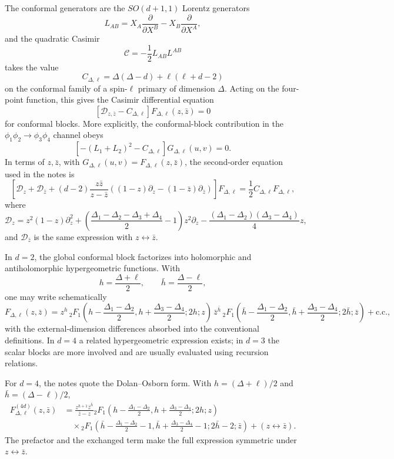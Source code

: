 The conformal generators are the \(SO(d+1,1)\) Lorentz generators
\[
  L_{AB}=X_A\frac{\partial}{\partial X^B}
        -X_B\frac{\partial}{\partial X^A},
\]
and the quadratic Casimir
\[
  \mathcal C=-\frac12 L_{AB}L^{AB}
\]
takes the value
\[
  C_{\Delta,\ell}
  =
  \Delta(\Delta-d)+\ell(\ell+d-2)
\]
on the conformal family of a spin-\(\ell\) primary of dimension
\(\Delta\).  Acting on the four-point function, this gives the Casimir
differential equation
\[
  \left[\mathcal D_{z,\bar z}-C_{\Delta,\ell}\right]
  F_{\Delta,\ell}(z,\bar z)=0
\]
for conformal blocks.
More explicitly, the conformal-block contribution in the
\(\phi_1\phi_2\to\phi_3\phi_4\) channel obeys
\[
  \left[-(L_1+L_2)^2-C_{\Delta,\ell}\right]
  G_{\Delta,\ell}(u,v)=0.
\]
In terms of \(z,\bar z\), with \(G_{\Delta,\ell}(u,v)=F_{\Delta,\ell}(z,\bar z)\),
the second-order equation used in the notes is
\[
  \left[
    \mathcal D_z+\mathcal D_{\bar z}
    +(d-2)\frac{z\bar z}{z-\bar z}
    \left((1-z)\partial_z-(1-\bar z)\partial_{\bar z}\right)
  \right]F_{\Delta,\ell}
  =
  \frac12 C_{\Delta,\ell}F_{\Delta,\ell},
\]
where
\[
  \mathcal D_z
  =
  z^2(1-z)\partial_z^2
  +\left(\frac{\Delta_1-\Delta_2-\Delta_3+\Delta_4}{2}-1\right)
  z^2\partial_z
  -\frac{(\Delta_1-\Delta_2)(\Delta_3-\Delta_4)}{4}z,
\]
and \(\mathcal D_{\bar z}\) is the same expression with
\(z\leftrightarrow\bar z\).

In \(d=2\), the global conformal block factorizes into holomorphic and
antiholomorphic hypergeometric functions.  With
\[
  h=\frac{\Delta+\ell}{2},
  \qquad
  \bar h=\frac{\Delta-\ell}{2},
\]
one may write schematically
\[
  F_{\Delta,\ell}(z,\bar z)
  =
  z^h\,
  {}_2F_1\!\left(
    h-\frac{\Delta_1-\Delta_2}{2},
    h+\frac{\Delta_3-\Delta_4}{2};
    2h;
    z
  \right)
  \,
  \bar z^{\bar h}\,
  {}_2F_1\!\left(
    \bar h-\frac{\Delta_1-\Delta_2}{2},
    \bar h+\frac{\Delta_3-\Delta_4}{2};
    2\bar h;
    \bar z
  \right)
  +\text{c.c.},
\]
with the external-dimension differences absorbed into the conventional
definitions.  In \(d=4\) a related hypergeometric expression exists; in
\(d=3\) the scalar blocks are more involved and are usually evaluated
using recursion relations.

For \(d=4\), the notes quote the Dolan--Osborn form.  With
\(h=(\Delta+\ell)/2\) and \(\bar h=(\Delta-\ell)/2\),
\[
\begin{aligned}
  F_{\Delta,\ell}^{(4d)}(z,\bar z)
  &=
  \frac{z^{h+1}\bar z^{\bar h}}{\bar z-z}
  {}_2F_1\!\left(
    h-\frac{\Delta_1-\Delta_2}{2},
    h+\frac{\Delta_3-\Delta_4}{2};
    2h;
    z
  \right) \\
  &\quad\times
  {}_2F_1\!\left(
    \bar h-\frac{\Delta_1-\Delta_2}{2}-1,
    \bar h+\frac{\Delta_3-\Delta_4}{2}-1;
    2\bar h-2;
    \bar z
  \right)
  +(z\leftrightarrow \bar z).
\end{aligned}
\]
The prefactor and the exchanged term make the full expression symmetric
under \(z\leftrightarrow\bar z\).

